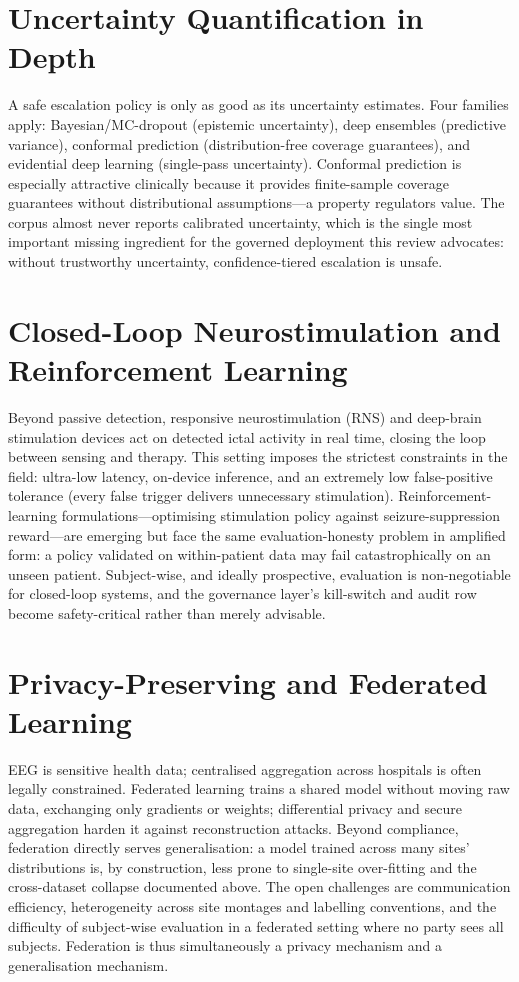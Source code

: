 \section{Uncertainty Quantification in Depth}
A safe escalation policy is only as good as its uncertainty estimates. Four families apply: Bayesian/MC-dropout (epistemic uncertainty), deep ensembles (predictive variance), conformal prediction (distribution-free coverage guarantees), and evidential deep learning (single-pass uncertainty). Conformal prediction is especially attractive clinically because it provides finite-sample coverage guarantees without distributional assumptions---a property regulators value. The corpus almost never reports calibrated uncertainty, which is the single most important missing ingredient for the governed deployment this review advocates: without trustworthy uncertainty, confidence-tiered escalation is unsafe.

\section{Closed-Loop Neurostimulation and Reinforcement Learning}
Beyond passive detection, responsive neurostimulation (RNS) and deep-brain stimulation devices act on detected ictal activity in real time, closing the loop between sensing and therapy. This setting imposes the strictest constraints in the field: ultra-low latency, on-device inference, and an extremely low false-positive tolerance (every false trigger delivers unnecessary stimulation). Reinforcement-learning formulations---optimising stimulation policy against seizure-suppression reward---are emerging but face the same evaluation-honesty problem in amplified form: a policy validated on within-patient data may fail catastrophically on an unseen patient. Subject-wise, and ideally prospective, evaluation is non-negotiable for closed-loop systems, and the governance layer's kill-switch and audit row become safety-critical rather than merely advisable.

\section{Privacy-Preserving and Federated Learning}
EEG is sensitive health data; centralised aggregation across hospitals is often legally constrained. Federated learning \citep{ep250808159} trains a shared model without moving raw data, exchanging only gradients or weights; differential privacy and secure aggregation harden it against reconstruction attacks. Beyond compliance, federation directly serves generalisation: a model trained across many sites' distributions is, by construction, less prone to single-site over-fitting and the cross-dataset collapse documented above. The open challenges are communication efficiency, heterogeneity across site montages and labelling conventions, and the difficulty of subject-wise evaluation in a federated setting where no party sees all subjects. Federation is thus simultaneously a privacy mechanism and a generalisation mechanism.

